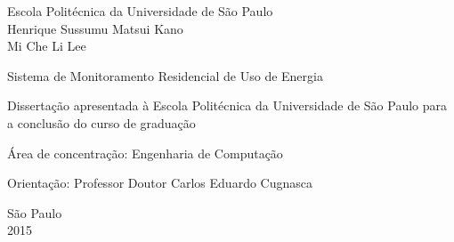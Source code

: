 \begin{titlepage}

\begin{center}
Escola Politécnica da Universidade de São Paulo\\
Henrique Sussumu Matsui Kano\\
Mi Che Li Lee

\vspace{90mm}
Sistema de Monitoramento Residencial de Uso de Energia
\end{center}

\vspace{20mm}
\large
\hspace{60mm}
\begin{minipage}{18em}
	Dissertação apresentada à Escola Politécnica da Universidade de São Paulo para a conclusão do curso de graduação
\end{minipage}

\hspace{60mm}\begin{minipage}{18em}
Área de concentração: Engenharia de Computação
\end{minipage}

\large
\hspace{60mm}\begin{minipage}{18em}
Orientação: Professor Doutor Carlos Eduardo Cugnasca
\end{minipage}

\begin{center}
\vfill
São Paulo\\
2015

\end{center}

\end{titlepage}
